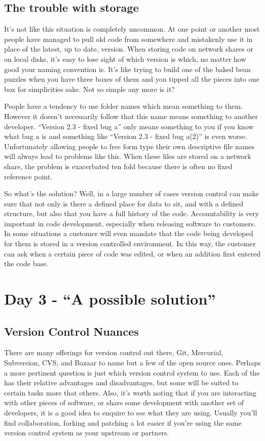 \subsection{The trouble with storage}

It's not like this situation is completely uncommon.  At one point or another most people have managed to pull old code from somewhere and mistakenly use it in place of the latest, up to date, version.  When storing code on network shares or on local disks, it's easy to lose sight of which version is which, no matter how good your naming convention is.  It's like trying to build one of the baked bean puzzles when you have three boxes of them and you tipped all the pieces into one box for simplicities sake.  Not so simple any more is it?

People have a tendency to use folder names which mean something to them.  However it doesn't necessarily follow that this name means something to another developer.  ``Version 2.3 - fixed bug a'' only means something to you if you know what bug a is and something like ``Version 2.3 - fixed bug a(2)'' is even worse.  Unfortunately allowing people to free form type their own descriptive file names will always lead to problems like this.  When these files are stored on a network share, the problem is exacerbated ten fold because there is often no fixed reference point.

So what's the solution?  Well, in a large number of cases version control can make sure that not only is there a defined place for data to sit, and with a defined structure, but also that you have a full history of the code.  Accountability is very important in code development, especially when releasing software to customers.  In some situations a customer will even mandate that the code being developed for them is stored in a version controlled environment.  In this way, the customer can ask when a certain piece of code was edited, or when an addition first entered the code base.

\section{Day 3 - ``A possible solution''}
\subsection{Version Control Nuances}

There are many offerings for version control out there, Git, Mercurial, Subversion, CVS, and Bazaar to name but a few of the open source ones.  Perhaps a more pertinent question is just which version control system to use.  Each of the has their relative advantages and disadvantages, but some will be suited to certain tasks more that others.  Also, it's worth noting that if you are interacting with other pieces of software, or share some development with another set of developers, it is a good idea to enquire to see what they are using.  Usually you'll find collaboration, forking and patching a lot easier if you're using the same version control system as your upstream or partners.

